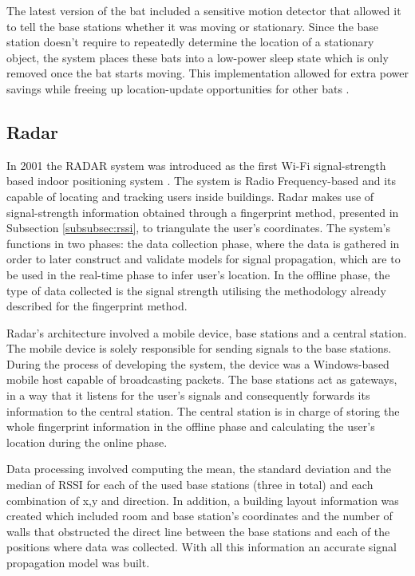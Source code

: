   
The latest version of the bat included a sensitive motion detector that allowed it to tell the base stations whether it was moving or stationary. Since the base station doesn't require to repeatedly determine the location of a stationary object, the system places these bats into a low-power sleep state which is only removed once the bat starts moving. This implementation allowed for extra power savings while freeing up location-update opportunities for other bats \cite{bat2}.  
  
  
\subsection{Radar}  
\label{subsec:radar}  
  
  
In 2001 the RADAR system was introduced as the first Wi-Fi signal-strength based indoor positioning system \cite{radar}. The system is Radio Frequency-based and its capable of locating and tracking users inside buildings. Radar makes use of signal-strength information obtained through a fingerprint method, presented in Subsection \ref{subsubsec:rssi}, to triangulate the user's coordinates. The system's functions in two phases: the data collection phase, where the data is gathered in order to later construct and validate models for signal propagation, which are to be used in the real-time phase to infer user's location. In the offline phase, the type of data collected is the signal strength utilising the methodology already described for the fingerprint method.  
  
  
Radar's architecture involved a mobile device, base stations and a central station. The mobile device is solely responsible for sending signals to the base stations. During the process of developing the system, the device was a Windows-based mobile host capable of broadcasting packets. The base stations act as gateways, in a way that it listens for the user's signals and consequently forwards its information to the central station. The central station is in charge of storing the whole fingerprint information in the offline phase and calculating the user's location during the online phase.  
  
  
Data processing involved computing the mean, the standard deviation and the median of \ac{RSSI} for each of the used base stations (three in total) and each combination of x,y and direction. In addition, a building layout information was created which included room and base station's coordinates and the number of walls that obstructed the direct line between the base stations and each of the positions where data was collected. With all this information an accurate signal propagation model was built.  
  

